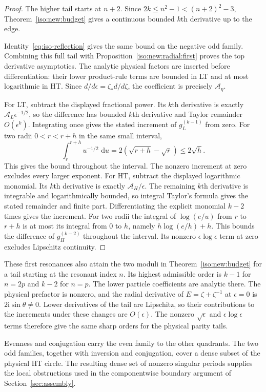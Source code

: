 \documentclass[11pt]{article}
\numberwithin{equation}{section}
\theoremstyle{definition}
\newcommand{\ii}{\mathrm i}
\newcommand{\dd}{\,\mathrm d}
\begin{document}
\begin{proof}
The higher tail starts at $n+2$. Since $2k\le n^2-1<(n+2)^2-3$,
Theorem~\ref{iso:new:budget} gives a continuous bounded $k$th
derivative up to the edge.

Identity~\eqref{eq:iso-reflection} gives the same bound on the
negative odd family.
Combining this full tail with
Proposition~\ref{iso:new:radial:first} proves the top
derivative asymptotics.  The analytic physical factors
are inserted before differentiation: their lower
product-rule terms are bounded in LT and at most
logarithmic in HT.  Since $d/d\epsilon=\zeta_*d/d\zeta$,
the coefficient is precisely $\mathcal A_\eta$.

For LT, subtract the displayed fractional power. Its
$k$th derivative is exactly
$\mathcal A_L\epsilon^{-1/2}$, so the difference has
bounded $k$th derivative and Taylor remainder
$O(\epsilon^k)$. Integrating once gives the stated increment of
$g_L^{(k-1)}$ from zero. For two radii $0<r<r+h$ in the same
small interval,
\[
 \int_r^{r+h} u^{-1/2}\,\dd u
 =2(\sqrt{r+h}-\sqrt r)\le 2\sqrt h .
\]
This gives the bound throughout the interval. The nonzero increment
at zero excludes every larger exponent.
For HT, subtract the displayed logarithmic monomial.
Its $k$th derivative is exactly $\mathcal A_H/\epsilon$.
The remaining $k$th derivative is integrable and
logarithmically bounded, so integral Taylor's formula
gives the stated remainder and finite part.  Differentiating
the explicit monomial $k-2$ times gives the increment.
For two radii the integral of $\log(e/u)$ from $r$ to $r+h$ is
at most its integral from $0$ to $h$, namely $h\log(e/h)+h$.
This bounds the difference of $g_H^{(k-2)}$ throughout the interval.
Its nonzero $\epsilon\log\epsilon$ term at zero excludes Lipschitz
continuity.
\end{proof}

These first resonances also attain the two moduli in
Theorem~\ref{iso:new:budget} for a tail starting at the resonant
index $n$. Its highest admissible order is $k-1$ for $n=2p$ and
$k-2$ for $n=p$. The lower particle coefficients are analytic there.
The physical prefactor is nonzero, and the radial derivative of
$E=\zeta+\zeta^{-1}$ at $\epsilon=0$ is $2\ii\sin\theta\ne0$.
Lower derivatives of the tail are Lipschitz, so their contributions
to the increments under these changes are $O(\epsilon)$. The nonzero
$\sqrt\epsilon$ and $\epsilon\log\epsilon$ terms therefore give the
same sharp orders for the physical parity tails.

Evenness and conjugation carry the even
family to the other quadrants.  The two odd families, together with
inversion and conjugation, cover a dense subset of the physical HT
circle. The resulting dense set of nonzero singular periods supplies
the local obstructions used in the componentwise boundary argument of
Section~\ref{sec:assembly}.
\end{document}
